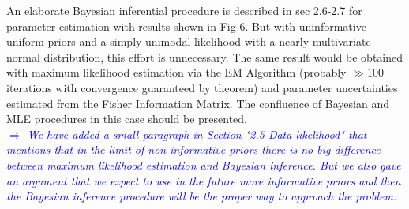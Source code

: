 \documentclass[10pt,a4paper]{article}
\newcommand{\Comment}[1]{\textsl{\textcolor{Blue}{$\Longrightarrow$ {#1}}}}
\begin{document}
An elaborate Bayesian inferential procedure is described in sec 2.6-2.7 for parameter estimation with results shown in Fig 6. But with uninformative uniform priors and a simply unimodal likelihood with a nearly multivariate normal distribution, this effort is unnecessary. The same result would be obtained with maximum likelihood estimation via the EM Algorithm (probably $\gg$100 iterations with convergence guaranteed by theorem) and parameter uncertainties estimated from the Fisher Information Matrix. The confluence of Bayesian and MLE procedures in this
case should be presented. \\\Comment{We have added a small paragraph in Section "2.5 Data likelihood" that mentions that in the limit of non-informative priors there is no big difference between maximum likelihood estimation and Bayesian inference. But we also gave an argument that we expect to use in the future more informative priors and then the Bayesian inference procedure will be the proper way to approach the problem.}
\end{document}
